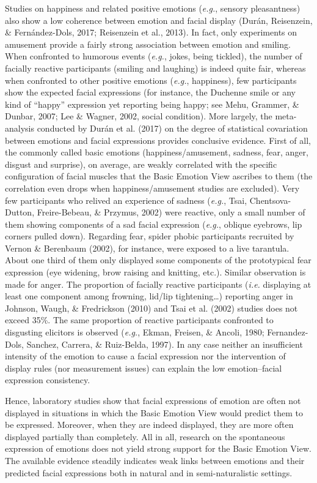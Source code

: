 \documentclass[man]{apa6}
\begin{document}
Studies on happiness and related positive emotions (\emph{e.g.}, sensory pleasantness) also show a low coherence between emotion and facial display (Durán, Reisenzein, \& Fernández-Dols, 2017; Reisenzein et al., 2013). In fact, only experiments on amusement provide a fairly strong association between emotion and smiling. When confronted to humorous events (\emph{e.g.}, jokes, being tickled), the number of facially reactive participants (smiling and laughing) is indeed quite fair, whereas when confronted to other positive emotions (\emph{e.g.}, happiness), few participants show the expected facial expressions (for instance, the Duchenne smile or any kind of ``happy'' expression yet reporting being happy; see Mehu, Grammer, \& Dunbar, 2007; Lee \& Wagner, 2002, social condition). More largely, the meta-analysis conducted by Durán et al. (2017) on the degree of statistical covariation between emotions and facial expressions provides conclusive evidence. First of all, the commonly called basic emotions (happiness/amusement, sadness, fear, anger, disgust and surprise), on average, are weakly correlated with the specific configuration of facial muscles that the Basic Emotion View ascribes to them (the correlation even drops when happiness/amusement studies are excluded). Very few participants who relived an experience of sadness (\emph{e.g.}, Tsai, Chentsova-Dutton, Freire-Bebeau, \& Przymus, 2002) were reactive, only a small number of them showing components of a sad facial expression (\emph{e.g.}, oblique eyebrows, lip corners pulled down). Regarding fear, spider phobic participants recruited by Vernon \& Berenbaum (2002), for instance, were exposed to a live tarantula. About one third of them only displayed some components of the prototypical fear expression (eye widening, brow raising and knitting, etc.). Similar observation is made for anger. The proportion of facially reactive participants (\emph{i.e.} displaying at least one component among frowning, lid/lip tightening\ldots{}) reporting anger in Johnson, Waugh, \& Fredrickson (2010) and Tsai et al. (2002) studies does not exceed 35\%. The same proportion of reactive participants confronted to disgusting elicitors is observed (\emph{e.g.}, Ekman, Freisen, \& Ancoli, 1980; Fernandez-Dols, Sanchez, Carrera, \& Ruiz-Belda, 1997). In any case neither an insufficient intensity of the emotion to cause a facial expression nor the intervention of display rules (nor measurement issues) can explain the low emotion--facial expression consistency.

Hence, laboratory studies show that facial expressions of emotion are often not displayed in situations in which the Basic Emotion View would predict them to be expressed. Moreover, when they are indeed displayed, they are more often displayed partially than completely. All in all, research on the spontaneous expression of emotions does not yield strong support for the Basic Emotion View. The available evidence steadily indicates weak links between emotions and their predicted facial expressions both in natural and in semi-naturalistic settings.
\end{document}
